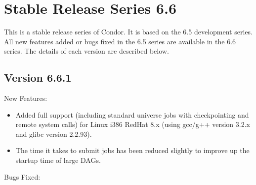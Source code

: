 \section{\label{sec:History-6-6}Stable Release Series 6.6}

This is a stable release series of Condor.
It is based on the 6.5 development series.
All new features added or bugs fixed in the 6.5 series are available
in the 6.6 series.
The details of each version are described below.

\subsection{\label{sec:New-6-6-1}Version 6.6.1}

\noindent New Features:

\begin{itemize}

\item Added full support (including standard universe jobs with
  checkpointing and remote system calls) for Linux i386 RedHat 8.x
  (using gcc/g++ version 3.2.x and glibc version 2.2.93). 

\item The time it takes  to submit jobs has been
      reduced slightly to improve up the startup time of large DAGs.

\end{itemize}

\noindent Bugs Fixed:

